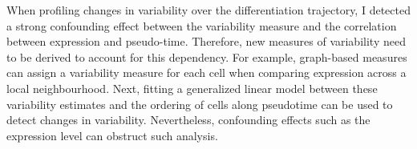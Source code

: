 When profiling changes in variability over the differentiation trajectory, I detected a strong confounding effect between the variability measure and the correlation between expression and pseudo-time. 
Therefore, new measures of variability need to be derived to account for this dependency. 
For example, graph-based measures can assign a variability measure for each cell when comparing expression across a local neighbourhood. 
Next, fitting a generalized linear model between these variability estimates and the ordering of cells along pseudotime can be used to detect changes in variability. 
Nevertheless, confounding effects such as the expression level can obstruct such analysis.

